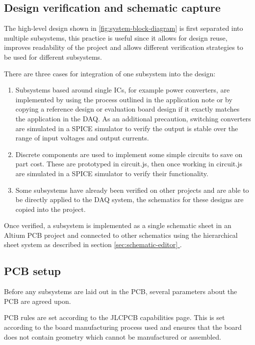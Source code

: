 \documentclass[draft]{report}
\newcommand*{\secref}[1]{section \hyperref[{#1}]{\ref*{#1} \nameref*{#1}}}
\begin{document}

\subsection{Design verification and schematic capture}

The high-level design shown in \ref{fig:system-block-diagram} is first separated into multiple subsystems, this practice is useful since it allows for design reuse, improves readability of the project and allows different verification strategies to be used for different subsystems.

There are three cases for integration of one subsystem into the design:

\begin{enumerate}
  \item Subsystems based around single ICs, for example power converters, are implemented by using the process outlined in the  application note or by copying a reference design or evaluation board design if it exactly matches the application in the DAQ. As an additional precaution, switching converters are simulated in a SPICE simulator to verify the output is stable over the range of input voltages and output currents.
  \item Discrete components are used to implement some simple circuits to save on part cost. These are prototyped in circuit.js, then once working in circuit.js are simulated in a SPICE simulator to verify their functionality.
  \item Some subsystems have already been verified on other projects and are able to be directly applied to the DAQ system, the schematics for these designs are copied into the project.
\end{enumerate}

Once verified, a subsystem is implemented as a single schematic sheet in an Altium PCB project and connected to other schematics using the hierarchical sheet system as described in \secref{sec:schematic-editor}.

\subsection{PCB setup}

Before any subsystems are laid out in the PCB, several parameters about the PCB are agreed upon.

PCB rules are set according to the JLCPCB capabilities page. This is set according to the board manufacturing process used and ensures that the board does not contain geometry which cannot be manufactured or assembled.
\end{document}
